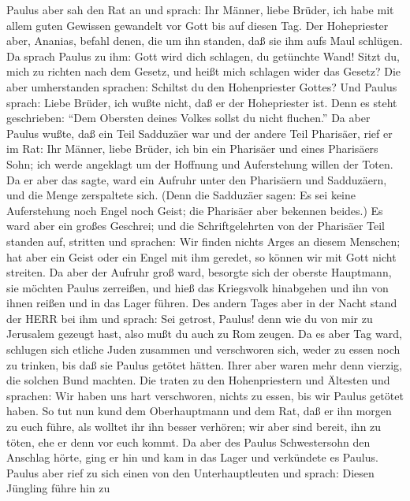  Paulus aber sah den Rat an und sprach: Ihr Männer, liebe
Brüder, ich habe mit allem guten Gewissen gewandelt vor Gott bis auf
diesen Tag.  Der Hohepriester aber, Ananias, befahl denen,
die um ihn standen, daß sie ihm aufs Maul schlügen.  Da
sprach Paulus zu ihm: Gott wird dich schlagen, du getünchte Wand! Sitzt
du, mich zu richten nach dem Gesetz, und heißt mich schlagen wider das
Gesetz?  Die aber umherstanden sprachen: Schiltst du den
Hohenpriester Gottes?  Und Paulus sprach: Liebe Brüder, ich
wußte nicht, daß er der Hohepriester ist. Denn es steht geschrieben:
``Dem Obersten deines Volkes sollst du nicht fluchen.''  Da
aber Paulus wußte, daß ein Teil Sadduzäer war und der andere Teil
Pharisäer, rief er im Rat: Ihr Männer, liebe Brüder, ich bin ein
Pharisäer und eines Pharisäers Sohn; ich werde angeklagt um der Hoffnung
und Auferstehung willen der Toten.  Da er aber das sagte,
ward ein Aufruhr unter den Pharisäern und Sadduzäern, und die Menge
zerspaltete sich.  (Denn die Sadduzäer sagen: Es sei keine
Auferstehung noch Engel noch Geist; die Pharisäer aber bekennen beides.)
 Es ward aber ein großes Geschrei; und die Schriftgelehrten
von der Pharisäer Teil standen auf, stritten und sprachen: Wir finden
nichts Arges an diesem Menschen; hat aber ein Geist oder ein Engel mit
ihm geredet, so können wir mit Gott nicht streiten.  Da
aber der Aufruhr groß ward, besorgte sich der oberste Hauptmann, sie
möchten Paulus zerreißen, und hieß das Kriegsvolk hinabgehen und ihn von
ihnen reißen und in das Lager führen.  Des andern Tages
aber in der Nacht stand der HERR bei ihm und sprach: Sei getrost,
Paulus! denn wie du von mir zu Jerusalem gezeugt hast, also mußt du auch
zu Rom zeugen.  Da es aber Tag ward, schlugen sich etliche
Juden zusammen und verschworen sich, weder zu essen noch zu trinken, bis
daß sie Paulus getötet hätten.  Ihrer aber waren mehr denn
vierzig, die solchen Bund machten.  Die traten zu den
Hohenpriestern und Ältesten und sprachen: Wir haben uns hart
verschworen, nichts zu essen, bis wir Paulus getötet haben.
 So tut nun kund dem Oberhauptmann und dem Rat, daß er ihn
morgen zu euch führe, als wolltet ihr ihn besser verhören; wir aber sind
bereit, ihn zu töten, ehe er denn vor euch kommt.  Da aber
des Paulus Schwestersohn den Anschlag hörte, ging er hin und kam in das
Lager und verkündete es Paulus.  Paulus aber rief zu sich
einen von den Unterhauptleuten und sprach: Diesen Jüngling führe hin zu
